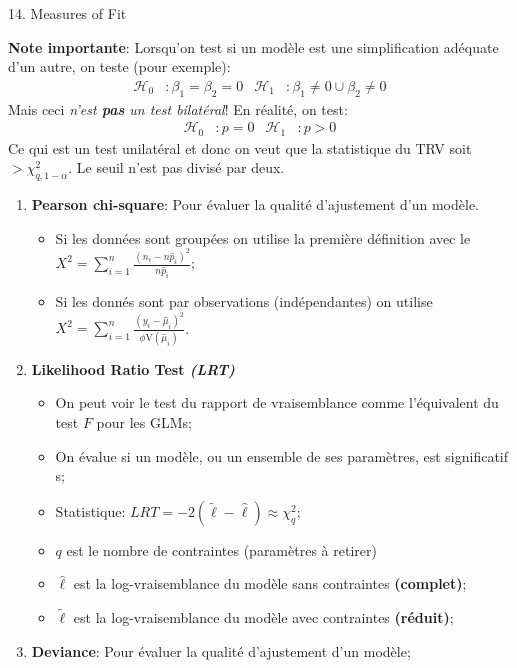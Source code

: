 \documentclass[12pt, titlepage, french]{report}
\begin{document}
\begin{CHPT_SUMM}[label = {GLM-MEZ-FIT}]{14. Measures of Fit}
\textbf{Note importante}: Lorsqu'on test si un modèle est une simplification adéquate d'un autre, on teste (pour exemple):
\begin{align*}
	\mathcal{H}_{0}&: \beta_{1} = \beta_{2} = 0	&
	\mathcal{H}_{1}&: \beta_{1} \neq 0 \cup \beta_{2} \neq 0
\end{align*}
Mais ceci \textit{n'est \textbf{pas} un test bilatéral}! En réalité, on test:
\begin{align*}
	\mathcal{H}_{0}&: p = 0	&
	\mathcal{H}_{1}&: p > 0 
\end{align*}
Ce qui est un test unilatéral et donc on veut que la statistique du TRV soit $> \chi^{2}_{q, 1 - \alpha}$. Le seuil n'est pas divisé par deux.
\begin{enumerate}
	\item	\textbf{Pearson chi-square}: Pour évaluer la qualité d'ajustement d'un modèle.
	\begin{itemize}
		\item	Si les données sont groupées on utilise la première définition avec le $X^{2} = \sum_{i = 1}^{n}\frac{(n_{i} - n \hat{p}_{i})^{2}}{n \hat{p}_{i}}$;
		\item	Si les donnés sont par observations (indépendantes) on utilise $X^{2} = \sum_{i = 1}^{n}\frac{(y_{i} - \hat{\mu}_{i})^{2}}{\phi \text{V}(\hat{\mu}_{i})}$.
	\end{itemize}
	\item	\textbf{Likelihood Ratio Test \textit{(LRT)}}
	\begin{itemize}
		\item	On peut voir le test du rapport de vraisemblance comme l'équivalent du test $F$ pour les GLMs;
		\item[]	On évalue si un modèle, ou un ensemble de ses paramètres, est significatif	s;
		\item	Statistique: $LRT = -2(\tilde{\ell} - \hat{\ell}) \approx	\chi_{q}^{2}$;
		\item[]	$q$ est le nombre de contraintes (paramètres à retirer)
		\item[]	$\hat{\ell}$ est la log-vraisemblance du modèle sans contraintes \textbf{(complet)};
		\item[]	$\tilde{\ell}$ est la log-vraisemblance du modèle avec contraintes \textbf{(réduit)};
	\end{itemize}
	\item	\textbf{Deviance}: Pour évaluer la qualité d'ajustement d'un modèle;

\end{enumerate}
\end{CHPT_SUMM}
\end{document}
